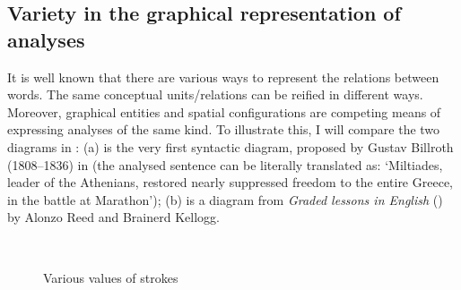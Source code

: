 \documentclass[english,output=paper,colorlinks,citecolor=brown]{../langscibook}
\begin{document}
\subsection{Variety in the graphical representation of analyses}\label{sec:4:2.2}
\largerpage
It is well known that there are various ways to represent the relations between words. The same conceptual units/relations can be reified in different ways. Moreover, graphical entities and spatial configurations are competing means of expressing analyses of the same kind. To illustrate this, I will compare the two diagrams in : (a) is the very first syntactic diagram, proposed by Gustav Billroth (1808–1836) in \citeyear{Billroth1832} (the analysed sentence can be literally translated as: `Miltiades, leader of the Athenians, restored nearly suppressed freedom to the entire Greece, in the battle at Marathon'); (b) is a diagram from \textit{Graded lessons in English} (\citeyear{ReedBrainerd1879}) by Alonzo Reed and Brainerd Kellogg.

\begin{figure}
	\\
        \medskip

	\caption{Various values of strokes\label{fig:4:2}}
\end{figure}
\end{document}
